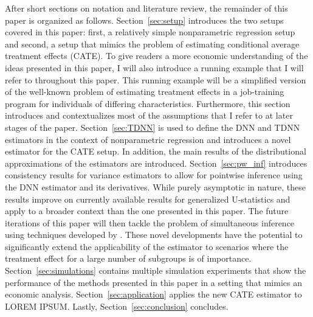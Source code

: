 After short sections on notation and literature review, the remainder of this paper is organized as follows.
Section~\ref{sec:setup} introduces the two setups covered in this paper: first, a relatively simple nonparametric regression setup and second, a setup that mimics the problem of estimating conditional average treatment effects (CATE).
To give readers a more economic understanding of the ideas presented in this paper, I will also introduce a running example that I will refer to throughout this paper.
This running example will be a simplified version of the well-known problem of estimating treatment effects in a job-training program for individuals of differing characteristics.
Furthermore, this section introduces and contextualizes most of the assumptions that I refer to at later stages of the paper.
Section~\ref{sec:TDNN} is used to define the DNN and TDNN estimators in the context of nonparametric regression and introduces a novel estimator for the CATE setup.
In addition, the main results of the distributional approximations of the estimators are introduced.
Section~\ref{sec:pw_inf} introduces consistency results for variance estimators to allow for pointwise inference using the DNN estimator and its derivatives.
While purely asymptotic in nature, these results improve on currently available results for generalized U-statistics and apply to a broader context than the one presented in this paper.
The future iterations of this paper will then tackle the problem of simultaneous inference using techniques developed by \citet{ritzwoller_simultaneous_2024}.
These novel developments have the potential to significantly extend the applicability of the estimator to scenarios where the treatment effect for a large number of subgroups is of importance.
Section~\ref{sec:simulations} contains multiple simulation experiments that show the performance of the methods presented in this paper in a setting that mimics an economic analysis.
Section~\ref{sec:application} applies the new CATE estimator to {\color{red} LOREM IPSUM}.
Lastly, Section~\ref{sec:conclusion} concludes.

\newpage
